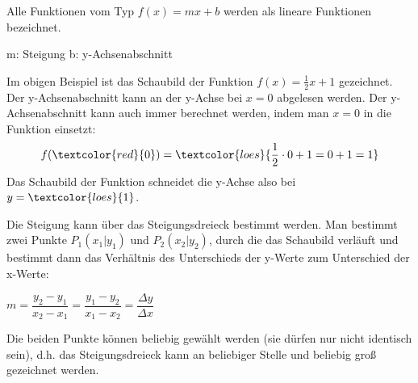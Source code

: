 
Alle Funktionen vom Typ $f(x)=mx+b$ werden als lineare Funktionen bezeichnet.
\begin{tcolorbox}
	\centering\textcolor{loestc}{m: Steigung \qquad	b: y-Achsenabschnitt}
\end{tcolorbox}
%

\medskip

Im obigen Beispiel ist das Schaubild der Funktion $f(x)=\frac{1}{2}x+1$ gezeichnet. Der y-Achsenabschnitt kann an der y-Achse bei $x=0$ abgelesen werden. Der y-Achsenabschnitt kann auch immer berechnet werden, indem man $x=0$ in die Funktion einsetzt:
\begin{align*}
	f(\textcolor{red}{0})=\textcolor{loes}{\frac{1}{2}\cdot 0+1=0+1=1}
\end{align*}
Das Schaubild der Funktion schneidet die y-Achse also bei $y=\textcolor{loes}{1}$\textcolor{loes}{.}

Die Steigung kann über das Steigungsdreieck bestimmt werden. Man bestimmt zwei Punkte $P_1(x_1|y_1)$ und $P_2(x_2|y_2)$, durch die das Schaubild verläuft und bestimmt dann das Verhältnis des Unterschieds der y-Werte zum Unterschied der x-Werte:
\begin{tcolorbox}
	\centering\textcolor{loestc}{$m=\dfrac{y_2-y_1}{x_2-x_1}=\dfrac{y_1-y_2}{x_1-x_2}=\dfrac{\Delta y}{\Delta x}$}
\end{tcolorbox}
Die beiden Punkte können beliebig gewählt werden (sie dürfen nur nicht identisch sein), d.h. das Steigungsdreieck kann an beliebiger Stelle und beliebig groß gezeichnet werden.

